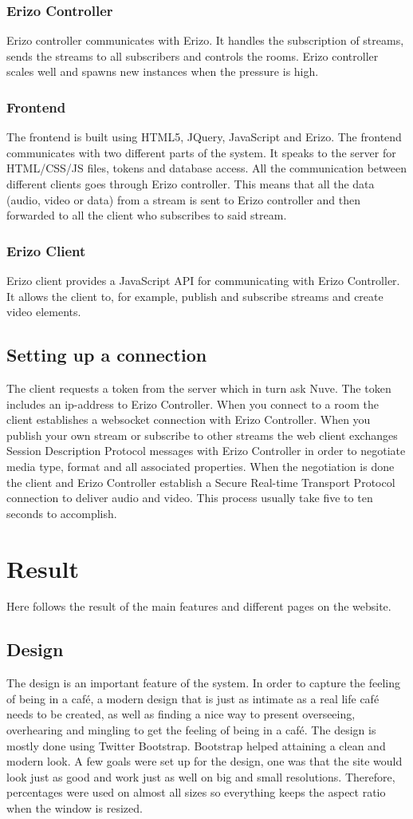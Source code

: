 \documentclass[12pt, titlepage]{article}
\begin{document}
\subsubsection{Erizo Controller}
Erizo controller communicates with Erizo. It handles the subscription of streams, sends the streams to all subscribers and controls the rooms. Erizo controller scales well and spawns new instances when the pressure is high.
\subsubsection{Frontend}
The frontend is built using HTML5, JQuery, JavaScript and Erizo. The frontend communicates with two different parts of the system. It speaks to the server for HTML/CSS/JS files, tokens and database access. All the communication between different clients goes through Erizo controller. This means that all the data (audio, video or data) from a stream is sent to Erizo controller and then forwarded to all the client who subscribes to said stream.
\subsubsection{Erizo Client}
Erizo client provides a JavaScript API for communicating with Erizo Controller. It allows the client to, for example, publish and subscribe streams and create video elements.
\subsection{Setting up a connection}
The client requests a token from the server which in turn ask Nuve. The token includes an ip-address to Erizo Controller. When you connect to a room the client establishes a websocket connection with Erizo Controller. When you publish your own stream or subscribe to other streams the web client exchanges Session Description Protocol messages with Erizo Controller in order to negotiate media type, format and all associated properties. When the negotiation is done the client and Erizo Controller establish a Secure Real-time Transport Protocol connection to deliver audio and video. This process usually take five to ten seconds to accomplish.
\section{Result}
Here follows the result of the main features and different pages on the website.
\subsection{Design}
The design is an important feature of the system. In order to capture the feeling of being in a café, a modern design that is just as intimate as a real life café needs to be created, as well as finding a nice way to present overseeing, overhearing and mingling to get the feeling of being in a café. The design is mostly done using Twitter Bootstrap. Bootstrap helped attaining a clean and modern look. A few goals were set up for the design, one was that the site would look just as good and work just as well on big and small resolutions. Therefore, percentages were used on almost all sizes so everything keeps the aspect ratio when the window is resized.
\end{document}
